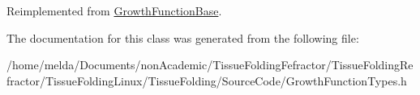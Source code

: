 Reimplemented from \hyperlink{classGrowthFunctionBase_ad6403a702f3ed53984083904755a832b}{Growth\+Function\+Base}.



The documentation for this class was generated from the following file\+:\begin{DoxyCompactItemize}
\item 
/home/melda/\+Documents/non\+Academic/\+Tissue\+Folding\+Fefractor/\+Tissue\+Folding\+Refractor/\+Tissue\+Folding\+Linux/\+Tissue\+Folding/\+Source\+Code/Growth\+Function\+Types.\+h\end{DoxyCompactItemize}
